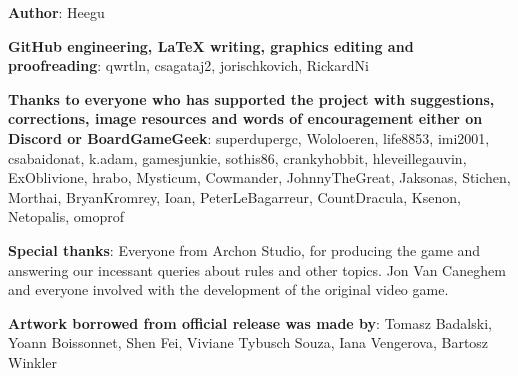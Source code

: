 
\bigbreak

\begin{multicols*}{2}

\textbf{Author}: Heegu\par
\textbf{GitHub engineering, LaTeX writing, graphics editing and proofreading}: qwrtln, csagataj2, jorischkovich, RickardNi\par
\textbf{Thanks to everyone who has supported the project with suggestions, corrections, image resources and words of encouragement either on Discord or BoardGameGeek}: superdupergc, Wololoeren, life8853, imi2001, csabaidonat, k.adam, gamesjunkie, sothis86, cranky\textunderscore hobbit, hleveillegauvin, ExOblivione, hrabo, Mysticum, Cowmander, JohnnyTheGreat, Jaksonas, Stichen, Morthai, BryanKromrey, Ioan, PeterLeBagarreur, \textunderscore Count\textunderscore Dracula\textunderscore , \space Ksenon, Netopalis, omoprof\par
\textbf{Special thanks}: Everyone from Archon Studio, for producing the game and answering our incessant queries about rules and other topics.
Jon Van Caneghem and everyone involved with the development of the original video game.\par
\textbf{Artwork borrowed from official release was made by}: Tomasz Badalski, Yoann Boissonnet, Shen Fei, Viviane Tybusch Souza, Iana Vengerova, Bartosz Winkler

\end{multicols*}

